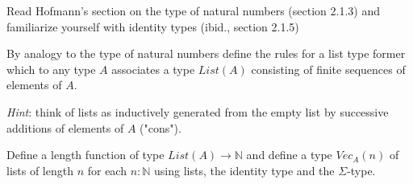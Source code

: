 \begin{exercise}
  Read Hofmann's section on the type of natural numbers (section 2.1.3) and
  familiarize yourself with identity types (ibid., section 2.1.5)

  By analogy to the type of natural numbers define the rules for a list type
  former which to any type $A$ associates a type $\mathit{List}(A)$ consisting
  of finite sequences of elements of $A$.

  \emph{Hint}: think of lists as inductively generated from the empty list by
  successive additions of elements of $A$ ("cons").

  Define a length function of type $\mathit{List}(A) \to \mathbb{N}$ and define
  a type $\mathit{Vec}_A(n)$ of lists of length $n$ for each $n : \mathbb{N}$
  using lists, the identity type and the $\Sigma$-type.
\end{exercise}

